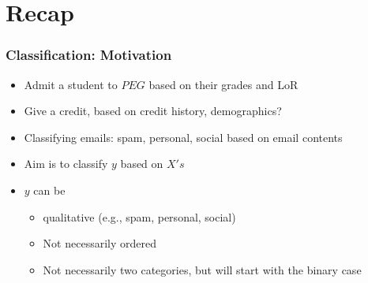 \documentclass[
  shownotes,
  xcolor={svgnames},
  hyperref={colorlinks,citecolor=DarkBlue,linkcolor=DarkRed,urlcolor=DarkBlue}
  , aspectratio=169]{beamer}
\begin{document}
\section{Recap }
\begin{frame}[fragile]
\frametitle{Classification: Motivation}

\begin{itemize}
\item Admit a student to $PEG$ based on their grades and LoR
\medskip
\item Give a credit, based on credit history, demographics?
\medskip
\item Classifying emails: spam, personal, social based on email contents
\medskip
\item Aim is to classify $y$ based on $X's$
\medskip
\item $y$ can be
\begin{itemize}
  \item qualitative (e.g., spam, personal, social)
  \item Not necessarily ordered
  \item Not necessarily two categories, but will start with the binary case

\end{itemize}
\end{itemize}


\end{frame}
\end{document}
